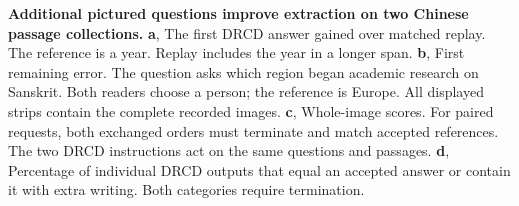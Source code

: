 \textbf{Additional pictured questions improve extraction on two Chinese passage collections.} \textbf{a}, The first DRCD answer gained over matched replay. The reference is a year. Replay includes the year in a longer span. \textbf{b}, First remaining error. The question asks which region began academic research on Sanskrit. Both readers choose a person; the reference is Europe. All displayed strips contain the complete recorded images. \textbf{c}, Whole-image scores. For paired requests, both exchanged orders must terminate and match accepted references. The two DRCD instructions act on the same questions and passages. \textbf{d}, Percentage of individual DRCD outputs that equal an accepted answer or contain it with extra writing. Both categories require termination.
